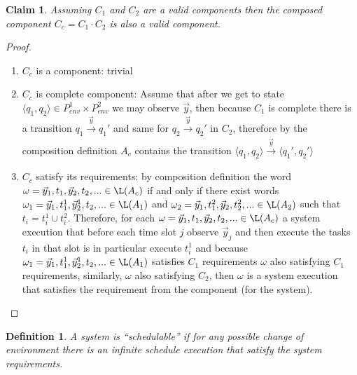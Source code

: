 \documentclass[ twoside, 12pt ]{article}
\newtheorem{dfn}{Definition} %
\newtheorem{claim}[thm]{Claim}
\newcommand{\commentOut}[1]{}
\begin{document}
\begin{claim}
    \label{thm:valid_composition}
    Assuming $C_1$ and $C_2$ are a valid components then the composed component $C_c=C_1 \cdot C_2$ is also a valid component.
\end{claim}
\begin{proof}
    \begin{enumerate}
        \item $C_c$ is a component: trivial 
        
        \item $C_c$ is complete component: Assume that after we get to state $\langle q_1 , q_2 \rangle \in P_{env}^1 \times P_{env}^2$ we may observe $\vec{y}$, then because $C_1$ is complete there is a transition $q_1 \xrightarrow[]{\vec{y}} q_1'$ and same for $q_2 \xrightarrow[]{\vec{y}} q_2'$ in $C_2$, therefore by the composition definition $A_c$ contains the transition $\langle q_1 , q_2 \rangle \xrightarrow[]{\vec{y}} \langle q_1' , q_2' \rangle$
        
        \item $C_c$ satisfy its requirements: by composition definition the word $\omega= \vec{y}_1 , t_1 , \vec{y}_2 , t_2, ... \in \L(A_c)$ if and only if there exist words $\omega_1= \vec{y}_1 , t_1^1 , \vec{y}_2^1 , t_2, ... \in \L(A_1)$ and $\omega_2= \vec{y}_1 , t_1^2 , \vec{y}_2 , t_2^2, ... \in \L(A_2)$ such that $t_i = t_i^1 \cup t_i^2$. 
        Therefore, for each $\omega = \vec{y}_1 , t_1 , \vec{y}_2 , t_2, ... \in \L(A_c)$ a system execution that before each time slot $j$ observe $\vec{y}_j$ and then execute the tasks $t_i$ in that slot is in particular execute $t_i^1$ and because $\omega_1= \vec{y}_1 , t_1^1 , \vec{y}_2^1 , t_2, ... \in \L(A_1)$ satisfies $C_1$ requirements $\omega$ also satisfying $C_1$ requirements, similarly, $\omega$ also satisfying $C_2$, then $\omega$ is a system execution that satisfies the requirement from the component (for the system).
        
    \end{enumerate}
\end{proof}


\commentOut{
\begin{dfn}
    \todo{recursive definition} A system is ``schedulable'' if for each posible state of the system at time step $i$ such that the system satisfy the  ements till time step $i$ there is a suitable scheduler reaction that lead to an execution that satisfy the system requirement 
\end{dfn}
}
\begin{dfn}
    A system is ``schedulable'' if for any possible change of environment there is an infinite schedule execution that satisfy the system requirements.
\end{dfn}
\end{document}
